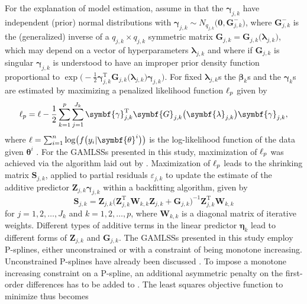 For the explanation of model estimation, assume in  that the \(\symbf{\gamma}_{j, k}\) have independent (prior) normal distributions with \(\symbf{\gamma}_{j, k} \sim N_{q_{j, k}}\bigl(\symbf{0}, \symbf{G}_{j, k}^-\bigr)\), where \(\symbf{G}_{j, k}^-\) is the (generalized) inverse of a \(q_{j, k} \times q_{j, k}\) symmetric matrix \(\symbf{G}_{j, k} = \symbf{G}_{j, k}\bigl(\symbf{\lambda}_{j, k}\bigr)\), which may depend on a vector of hyperparameters \(\symbf{\lambda}_{j, k}\) and where if \(\symbf{G}_{j, k}\) is singular \(\symbf{\gamma}_{j, k}\) is understood to have an improper prior density function proportional to \(\exp\bigl(-\frac{1}{2} \symbf{\gamma}_{j, k}^{\text{T}} \symbf{G}_{j, k}\bigl(\symbf{\lambda}_{j, k}\bigr) \symbf{\gamma}_{j, k}\bigr)\).  For fixed \(\symbf{\lambda}_{j, k}\)s the \(\symbf{\beta}_k\)s and the \(\symbf{\gamma}_k\)s are estimated by maximizing a penalized likelihood function \(\ell_p\) given by
\begin{equation}
  \label{eq:GAMLSSRigbyStasinopoulos2005PenalizedLikelihood}
  \loglikelihood_p = \loglikelihood - \frac{1}{2} \sum_{k = 1}^p \sum_{j = 1}^{J_k} \symbf{\gamma}_{j, k}^{\text{T}} \symbf{G}_{j, k}\bigl(\symbf{\lambda}_{j, k}\bigr) \symbf{\gamma}_{j, k},
\end{equation}
where \(\loglikelihood = \sum_{i = 1}^n \log\bigl(f\bigl(y_i | \symbf{\theta}^i\bigr)\bigr)\) is the log-likelihood function of the data given \(\symbf{\theta}^i\) \parencite{Rigby2005}.  For the GAMLSSs presented in this study, maximization of \(\ell_p\) was achieved via the algorithm laid out by \textcite{Rigby1996}.  Maximization of \(\ell_p\) leads to the shrinking matrix \(\symbf{S}_{j, k}\), applied to partial residuals \(\varepsilon_{j, k}\) to update the estimate of the additive predictor \(\symbf{Z}_{j, k} \symbf{\gamma}_{j, k}\) within a backfitting algorithm, given by
\begin{equation}
  \label{eq:GAMLSSRigbyStasinopoulos2005BackfittingAlgorithm}
  \symbf{S}_{j, k} = \symbf{Z}_{j, k} \bigl(\symbf{Z}_{j, k}^{\text{T}} \symbf{W}_{k, k} \symbf{Z}_{j, k} + \symbf{G}_{j, k}\bigr)^{-1} \symbf{Z}_{j, k}^{\text{T}} \symbf{W}_{k, k}
\end{equation}
for \(j = 1, 2, \ldots, J_k\) and \(k = 1, 2, \ldots, p\), where \(\symbf{W}_{k, k}\) is a diagonal matrix of iterative weights.  Different types of additive terms in the linear predictor \(\symbf{\eta}_k\) lead to different forms of \(\symbf{Z}_{j, k}\) and \(\symbf{G}_{j, k}\).  The GAMLSSs presented in this study employ P-splines, either unconstrained \parencite{Eilers1996} or with a constraint of being monotone increasing.  Unconstrained P-splines have already been discussed .  To impose a monotone increasing constraint on a P-spline, an additional asymmetric penalty on the first-order differences has to be added to .  The least squares objective function to minimize thus becomes
